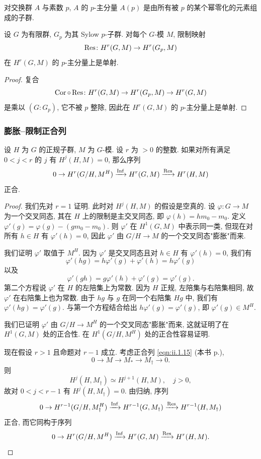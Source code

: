 对交换群 $A$ 与素数 $p$, $A$ 的 $p$-主分量 $A(p)$ 是由所有被 $p$ 的某个幂零化的元素组成的子群.

\begin{corollary}\label{cor:ii.1.33}
设 $G$ 为有限群, $G_p$ 为其 Sylow $p$-子群. 对每个 $G$-模 $M$, 限制映射
\[
 \operatorname{Res}\colon H^r(G,M)\to H^r(G_p,M)
\]
在 $H^r(G,M)$ 的 $p$-主分量上是单射.
\end{corollary}

\begin{proof}
复合
\[
 \operatorname{Cor}\circ\operatorname{Res}\colon H^r(G,M)\to H^r(G_p,M)\to H^r(G,M)
\]
是乘以 $(G:G_p)$, 它不被 $p$ 整除, 因此在 $H^r(G,M)$ 的 $p$-主分量上是单射.
\end{proof}

\subsubsection*{膨胀--限制正合列}

\begin{proposition}\label{prop:ii.1.34}
设 $H$ 为 $G$ 的正规子群, $M$ 为 $G$-模. 设 $r$ 为 $>0$ 的整数. 如果对所有满足 $0<j<r$ 的 $j$ 有 $H^j(H,M)=0$, 那么序列
\[
 0\to H^r(G/H,M^H)\xrightarrow{\operatorname{Inf}} H^r(G,M)\xrightarrow{\operatorname{Res}} H^r(H,M)
\]
正合.
\end{proposition}

\begin{proof}
我们先对 $r=1$ 证明. 此时对 $H^j(H,M)$ 的假设是空真的. 设 $\varphi\colon G\to M$ 为一个交叉同态, 其在 $H$ 上的限制是主交叉同态, 即 $\varphi(h)=hm_0-m_0$. 定义 $\varphi'(g)=\varphi(g)-(gm_0-m_0)$. 则 $\varphi'$ 在 $H^1(G,M)$ 中表示同一类, 但现在对所有 $h\in H$ 有 $\varphi'(h)=0$, 因此 $\varphi'$ 由 $G/H\to M$ 的一个交叉同态"膨胀"而来.

我们证明 $\varphi'$ 取值于 $M^H$. 因为 $\varphi'$ 是交叉同态且对 $h\in H$ 有 $\varphi'(h)=0$, 我们有
\[
 \varphi'(hg)=h\varphi'(g)+\varphi'(h)=h\varphi'(g)
\]
以及
\[
 \varphi'(gh)=g\varphi'(h)+\varphi'(g)=\varphi'(g).
\]
第二个方程说 $\varphi'$ 在 $H$ 的左陪集上为常数. 因为 $H$ 正规, 左陪集与右陪集相同, 故 $\varphi'$ 在右陪集上也为常数. 由于 $hg$ 与 $g$ 在同一个右陪集 $Hg$ 中, 我们有 $\varphi'(hg)=\varphi'(g)$. 与第一个方程结合给出 $h\varphi'(g)=\varphi'(g)$, 即 $\varphi'(g)\in M^H$.

我们已证明 $\varphi'$ 由 $G/H\to M^H$ 的一个交叉同态"膨胀"而来, 这就证明了在 $H^1(G,M)$ 处的正合性. 在 $H^1(G/H,M^H)$ 处的正合性容易证明.

现在假设 $r>1$ 且命题对 $r-1$ 成立. 考虑正合列 \ref{eqn:ii.1.15} (本书 p.\pageref{eqn:ii.1.15}),
\[
 0\to M\to M_*\to M_\dagger\to 0.
\]
则
\[
 H^j(H,M_\dagger)\simeq H^{j+1}(H,M),\quad j>0,
\]
故对 $0<j<r-1$ 有 $H^j(H,M_\dagger)=0$. 由归纳, 序列
\[
 0\to H^{r-1}(G/H,M_\dagger^H)\xrightarrow{\operatorname{Inf}} H^{r-1}(G,M_\dagger)\xrightarrow{\operatorname{Res}} H^{r-1}(H,M_\dagger)
\]
正合, 而它同构于序列
\[
 0\to H^r(G/H,M^H)\xrightarrow{\operatorname{Inf}} H^r(G,M)\xrightarrow{\operatorname{Res}} H^r(H,M).
\]
\end{proof}

